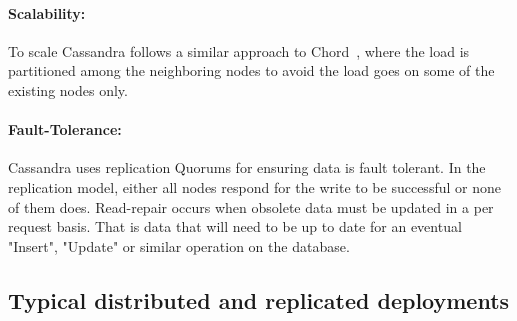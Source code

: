 \paragraph{Scalability:}
To scale Cassandra follows a similar approach to Chord~\cite{Stoica:2001}, where the load is partitioned among the neighboring nodes to avoid the load goes on some of the existing nodes only.

\paragraph{Fault-Tolerance:}
Cassandra uses replication Quorums for ensuring data is fault tolerant. In the replication model, either all nodes respond for the write to be successful or none of them does. Read-repair occurs when obsolete data must be updated in a per request basis. That is data that will need to be up to date for an eventual "Insert", "Update" or similar operation on the database.

%


\subsection{Typical distributed and replicated deployments}\label{distributed-architecture}

